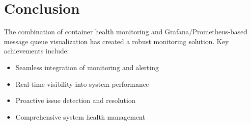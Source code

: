 \documentclass[12pt,a4paper]{article}
\begin{document}
\section{Conclusion}

The combination of container health monitoring and Grafana/Prometheus-based message queue visualization has created a robust monitoring solution. Key achievements include:
\begin{itemize}
    \item Seamless integration of monitoring and alerting
    \item Real-time visibility into system performance
    \item Proactive issue detection and resolution
    \item Comprehensive system health management
\end{itemize}
\end{document}
